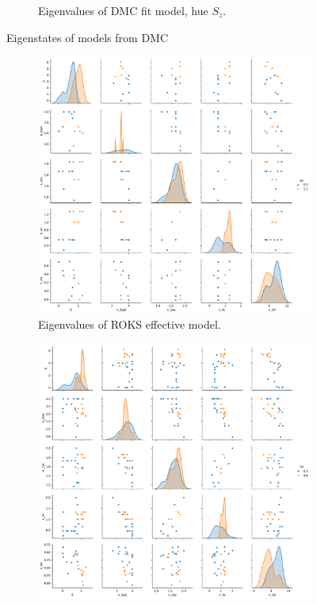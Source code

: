 \documentclass{article}
\begin{document}
\begin{figure}
\begin{subfigure}{.5\textwidth}
  \caption{Eigenvalues of DMC fit model, hue $S_z$.}
  \label{fig:sub2}
\end{subfigure}
\label{fig:test1}
\caption{Eigenstates of models from DMC}
\end{figure}

\begin{figure}
\centering
\begin{subfigure}{.5\textwidth}
  \centering
  \includegraphics[width=\linewidth]{../qwalk/ub3lyp_s1_/analysis/roks_eigenvalues.pdf}
  \caption{Eigenvalues of ROKS effective model.}
  \label{fig:sub3}
\end{subfigure}%
\begin{subfigure}{.5\textwidth}
  \centering
  \includegraphics[width=\linewidth]{../qwalk/ub3lyp_s1_/analysis/uks_eigenvalues.pdf}

\end{subfigure}
\end{figure}
\end{document}
